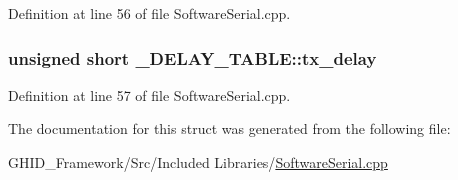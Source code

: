 \-Definition at line 56 of file \-Software\-Serial.\-cpp.

\hypertarget{struct___d_e_l_a_y___t_a_b_l_e_a20098fe273924c2456690a6ea96dc891}{
\subsubsection[{tx\-\_\-delay}]{\setlength{\rightskip}{0pt plus 5cm}unsigned short {\bf \-\_\-\-D\-E\-L\-A\-Y\-\_\-\-T\-A\-B\-L\-E\-::tx\-\_\-delay}}}\label{struct___d_e_l_a_y___t_a_b_l_e_a20098fe273924c2456690a6ea96dc891}


\-Definition at line 57 of file \-Software\-Serial.\-cpp.



\-The documentation for this struct was generated from the following file\-:\begin{DoxyCompactItemize}
\item 
\-G\-H\-I\-D\-\_\-\-Framework/\-Src/\-Included Libraries/\hyperlink{_software_serial_8cpp}{\-Software\-Serial.\-cpp}\end{DoxyCompactItemize}
